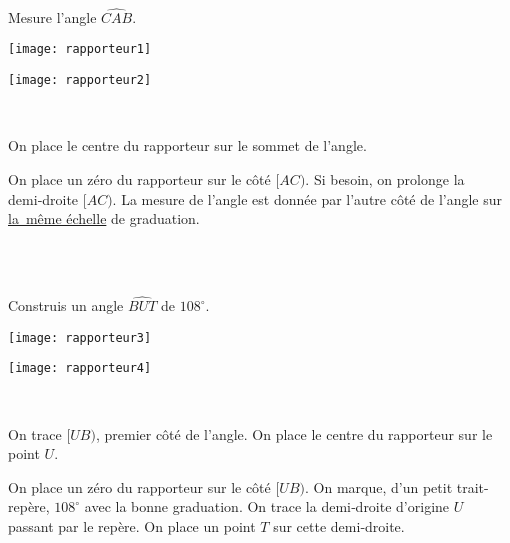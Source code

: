 \begin{methode*1}

\begin{exemple*1}  \\[0.75em]
Mesure l'angle $\widehat{CAB}$.

\begin{minipage}[c]{0.43\textwidth}
\centering
\texttt{[image: rapporteur1]}
\end{minipage}\hfill%
 \begin{minipage}[c]{0.53\textwidth}%
 \centering
 \texttt{[image: rapporteur2]}
  \end{minipage} \\
 \begin{minipage}[c]{0.43\textwidth}
On place le centre du rapporteur sur le sommet de l'angle.
\end{minipage} \hfill%
 \begin{minipage}[c]{0.53\textwidth}
 On place un zéro du rapporteur sur le côté $[AC)$. Si besoin, on prolonge la demi‑droite $[AC)$. La mesure de l'angle est donnée par l'autre côté de l'angle sur \underline{la même échelle} de graduation.
 \end{minipage} \\
  \end{exemple*1}
 
 \begin{exemple*1}  \\[0.75em]

Construis un angle $\widehat{BUT}$ de $108^\circ$.

\begin{minipage}[c]{0.43\textwidth}
\centering
\texttt{[image: rapporteur3]}
\end{minipage}\hfill%
 \begin{minipage}[c]{0.53\textwidth}%
 \centering
 \texttt{[image: rapporteur4]}
  \end{minipage} \\
 \begin{minipage}[c]{0.43\textwidth}
On trace $[UB)$, premier côté de l'angle. On place le centre du rapporteur sur le point $U$.
\end{minipage} \hfill%
 \begin{minipage}[c]{0.53\textwidth}
 On place un zéro du rapporteur sur le côté $[UB)$. On marque, d'un petit trait-repère, $108^\circ$ avec la bonne graduation.
On trace la demi‑droite d'origine $U$ passant par le repère. On place un point $T$ sur cette demi‑droite.
  \end{minipage} \\
  \end{exemple*1}
 

\end{methode*1}
